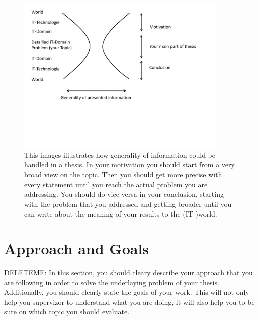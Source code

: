 \begin{figure}
\centering
\includegraphics[width=0.9\textwidth]{template/writing}
\caption[Information Generality]{This images illustrates how generality of information could be handled in a thesis. In your motivation you should start from a very broad view on the topic. Then you should get more precise with every statement until you reach the actual problem you are addressing. You should do vice-versa in your conclusion, starting with the problem that you addressed and getting broader until you can write about the meaning of your results to the (IT-)world.\label{fig:writing}}
\end{figure}


\section{Approach and Goals}
DELETEME: In this section, you should cleary describe your approach that you are following in order to solve the underlaying problem of your thesis. Additionally, you should clearly state the goals of your work. This will not only help you supervizor to understand what you are doing, it will also help you to be sure on which topic you should evaluate.


